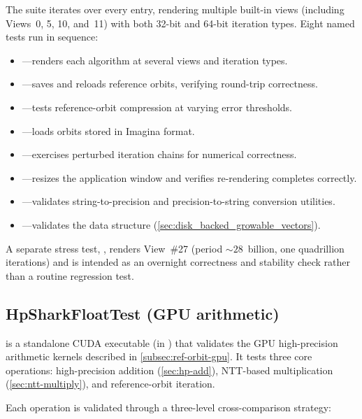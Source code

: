 The suite iterates over every  entry, rendering
multiple built-in views (including Views~0, 5, 10, and~11) with both
32-bit and 64-bit iteration types.  Eight named tests run in sequence:

\begin{itemize}
  \item {}---renders each algorithm at several views and
        iteration types.
  \item {}---saves and reloads reference orbits,
        verifying round-trip correctness.
  \item {}---tests reference-orbit compression
        at varying error thresholds.
  \item {}---loads orbits stored in Imagina format.
  \item {}---exercises perturbed iteration
        chains for numerical correctness.
  \item {}---resizes the application window and
        verifies re-rendering completes correctly.
  \item {}---validates string-to-precision and
        precision-to-string conversion utilities.
  \item {}---validates the
         data structure
        (\cref{sec:disk_backed_growable_vectors}).
\end{itemize}

\noindent
A separate stress test, , renders View~\#27
(period ${\sim}28$~billion, one quadrillion iterations) and is intended
as an overnight correctness and stability check rather than a routine
regression test.

\subsection{HpSharkFloatTest (GPU arithmetic)}
\label{subsec:hpsharkfloattest}

 is a standalone CUDA executable (in
) that validates the GPU high-precision
arithmetic kernels described in \cref{subsec:ref-orbit-gpu}.  It tests
three core operations: high-precision addition
(\cref{sec:hp-add}), NTT-based multiplication
(\cref{sec:ntt-multiply}), and reference-orbit iteration.

Each operation is validated through a three-level cross-comparison
strategy:

